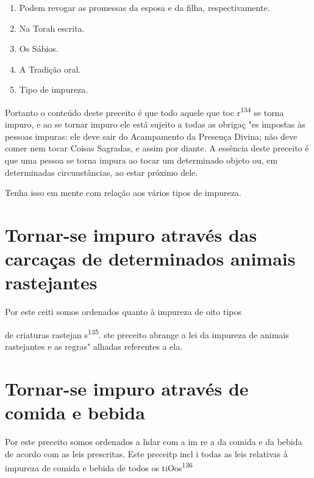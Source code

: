 \begin{enumerate}
\def\labelenumi{\arabic{enumi}.}
\setcounter{enumi}{128}
\item
 
 Podem revogar as promessas da esposa e da filha, respectivamente.
 
\item
 
 Na Torah escrita.
 
\item
 
 Os Sábios.
 
\item
 
 A Tradição oral.
 
\item
 
 Tipo de impureza.
 
\end{enumerate}
Portanto o conteúdo deste preceito é que todo aquele que toc
r\textsuperscript{134} se torna impuro, e ao se tornar impuro ele está
sujeito a todas as obrigaç "es impostas às pessoas impuras: ele deve
sair do Acampamento da Presença Divi­na; não deve comer nem tocar Coisas
Sagradas, e assim por diante. A essência deste preceito é que uma pessoa
se torna impura ao tocar um determinado ob­jeto ou, em determinadas
circunstâncias, ao estar próximo dele.

Tenha isso em mente com relação aos vários tipos de impureza.


\section{Tornar-se impuro através das carcaças de determinados animais rastejantes}

Por este ceiti somos ordenados quanto à impureza de oito tipos


de criaturas rastejan s\textsuperscript{135}. ste preceito abrange a lei
da impureza de animais rastejantes e as regras" alhadas referentes a
ela.

\section{Tornar-se impuro através de comida e bebida}

Por este preceito somos ordenados a lidar com a im re a da comi­da e da
bebida de acordo com as leis prescritas. Este preceitp incl i todas as
leis relativas à impureza de comida e bebida de todos os
tiOos\textsuperscript{136}

